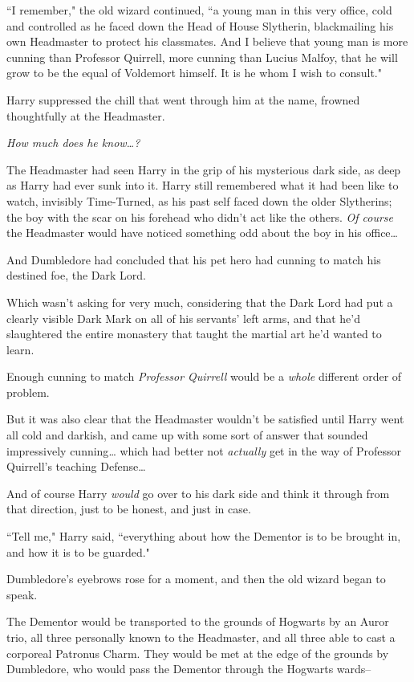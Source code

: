 ``I remember," the old wizard continued, ``a young man in this very office, cold and controlled as he faced down the Head of House Slytherin, blackmailing his own Headmaster to protect his classmates. And I believe that young man is more cunning than Professor Quirrell, more cunning than Lucius Malfoy, that he will grow to be the equal of Voldemort himself. It is he whom I wish to consult."

Harry suppressed the chill that went through him at the name, frowned thoughtfully at the Headmaster.

\emph{How much does he know{\ldots}?}

The Headmaster had seen Harry in the grip of his mysterious dark side, as deep as Harry had ever sunk into it. Harry still remembered what it had been like to watch, invisibly Time-Turned, as his past self faced down the older Slytherins; the boy with the scar on his forehead who didn't act like the others. \emph{Of course} the Headmaster would have noticed something odd about the boy in his office{\ldots}

And Dumbledore had concluded that his pet hero had cunning to match his destined foe, the Dark Lord.

Which wasn't asking for very much, considering that the Dark Lord had put a clearly visible Dark Mark on all of his servants' left arms, and that he'd slaughtered the entire monastery that taught the martial art he'd wanted to learn.

Enough cunning to match \emph{Professor Quirrell} would be a \emph{whole} different order of problem.

But it was also clear that the Headmaster wouldn't be satisfied until Harry went all cold and darkish, and came up with some sort of answer that sounded impressively cunning{\ldots} which had better not \emph{actually} get in the way of Professor Quirrell's teaching Defense{\ldots}

And of course Harry \emph{would} go over to his dark side and think it through from that direction, just to be honest, and just in case.

``Tell me," Harry said, ``everything about how the Dementor is to be brought in, and how it is to be guarded."

Dumbledore's eyebrows rose for a moment, and then the old wizard began to speak.

The Dementor would be transported to the grounds of Hogwarts by an Auror trio, all three personally known to the Headmaster, and all three able to cast a corporeal Patronus Charm. They would be met at the edge of the grounds by Dumbledore, who would pass the Dementor through the Hogwarts wards\---


